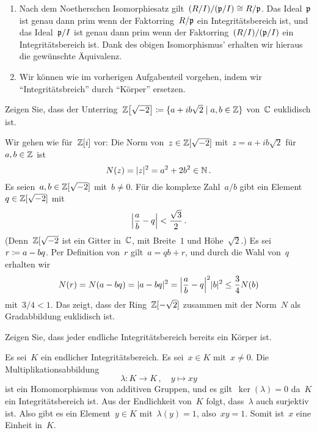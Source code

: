 \documentclass{scrartcl}
\begin{document}
\begin{solution}
  \begin{enumerate}
    \item
      Nach dem Noetherschen Isomorphiesatz gilt~$(R/I) / (\pideal/I) \cong R/\pideal$.
      Das Ideal~$\pideal$ ist genau dann prim wenn der Faktorring~$R / \pideal$ ein Integritätsbereich ist, und das Ideal~$\pideal/I$ ist genau dann prim wenn der Faktorring~$(R/I) / (\pideal/I)$ ein Integritätsbereich ist.
      Dank des obigen Isomorphismus’ erhalten wir hieraus die gewünschte Äquivalenz.
    \item
      Wir können wie im vorherigen Aufgabenteil vorgehen, indem wir \enquote{Integritätsbreich} durch \enquote{Körper} ersetzen.
  \end{enumerate}
\end{solution}

\begin{exercise}
  Zeigen Sie, dass der Unterring~$\Integer\bigl[ \sqrt{-2} \bigr] \defined \{ a + i b \sqrt{2} \suchthat a, b \in \Integer \}$ von~$\Complex$ euklidisch ist.
\end{exercise}

\begin{solution}
  Wir gehen wie für~$\Integer[i]$ vor:
  Die Norm von~$z \in \Integer[\sqrt{-2}]$ mit~$z = a + i b \sqrt{2}$ für~$a, b \in \Integer$ ist
  \[
    N(z)
    =
    \abs{z}^2
    =
    a^2 + 2 b^2
    \in
    \Natural \,.
  \]
  Es seien~$a, b \in \Integer[\sqrt{-2}]$ mit~$b \neq 0$.
  Für die komplexe Zahl~$a/b$ gibt ein Element~$q \in \Integer[\sqrt{-2}]$ mit
  \[
    \abs*{ \frac{a}{b} - q }
    <
    \frac{ \sqrt{3} }{2} \,.
  \]
  (Denn~$\Integer[\sqrt{-2}$ ist ein Gitter in~$\Complex$, mit Breite~$1$ und Höhe~$\sqrt{2}$.)
  Es sei~$r \defined a - bq$.
  Per Definition von~$r$ gilt~$a = qb + r$, und durch die Wahl von~$q$ erhalten wir
  \[
    N(r)
    =
    N(a - bq)
    =
    \abs{a - bq}^2
    =
    \abs*{ \frac{a}{b} - q }^2 \abs{b}^2
    \leq
    \frac{3}{4} N(b)
  \]
  mit~$3/4 < 1$.
  Das zeigt, dass der Ring~$\Integer[-\sqrt{2}]$ zusammen mit der Norm~$N$ als Gradabbildung euklidisch ist.
\end{solution}

\begin{exercise}
  Zeigen Sie, dass jeder endliche Integritätsbereich bereits ein Körper ist.
\end{exercise}

\begin{solution}
  Es sei~$K$ ein endlicher Integritätsbereich.
  Es sei~$x \in K$ mit~$x \neq 0$.
  Die Multiplikationsabbildung
  \[
    \lambda
    \colon
    K \to K \,,
    \quad
    y \mapsto xy
  \]
  ist ein Homomorphismus von additiven Gruppen, und es gilt~$\ker(\lambda) = 0$ da~$K$ ein Integritätsbereich ist.
  Aus der Endlichkeit von~$K$ folgt, dass~$\lambda$ auch surjektiv ist.
  Also gibt es ein Element~$y \in K$ mit~$\lambda(y) = 1$, also~$x y = 1$.
  Somit ist~$x$ eine Einheit in~$K$.
\end{solution}





\clearpage





\printsolutions
\end{document}
